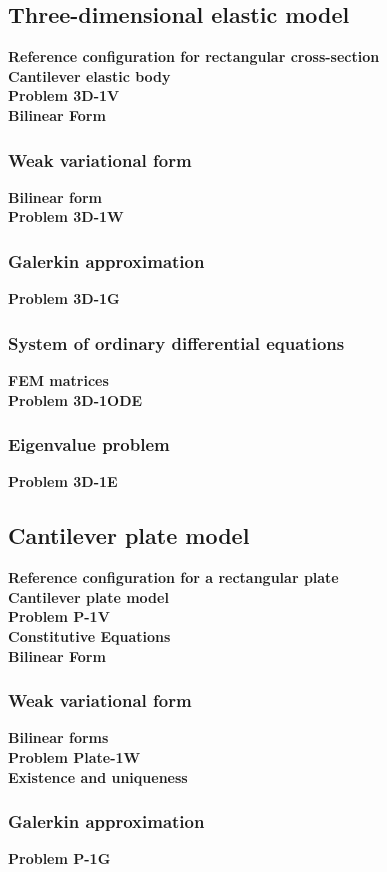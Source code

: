 \documentclass[../main.tex]{subfiles}
\begin{document}
\subsection{Three-dimensional elastic model}
\textbf{Reference configuration for rectangular cross-section}\\
\textbf{Cantilever elastic body}\\
\textbf{Problem 3D-1V}\\
\textbf{Bilinear Form}
\subsubsection{Weak variational form}
\textbf{Bilinear form}\\
\textbf{Problem 3D-1W}
\subsubsection{Galerkin approximation}
\textbf{Problem 3D-1G}
\subsubsection{System of ordinary differential equations}
\textbf{FEM matrices}\\
\textbf{Problem 3D-1ODE}
\subsubsection{Eigenvalue problem}
\textbf{Problem 3D-1E}
\subsection{Cantilever plate model}
\textbf{Reference configuration for a rectangular plate}\\
\textbf{Cantilever plate model}\\
\textbf{Problem P-1V}\\
\textbf{Constitutive Equations}\\
\textbf{Bilinear Form}
\subsubsection{Weak variational form}
\textbf{Bilinear forms}\\
\textbf{Problem Plate-1W}\\
\textbf{Existence and uniqueness}
\subsubsection{Galerkin approximation}
\textbf{Problem P-1G}
\end{document}
